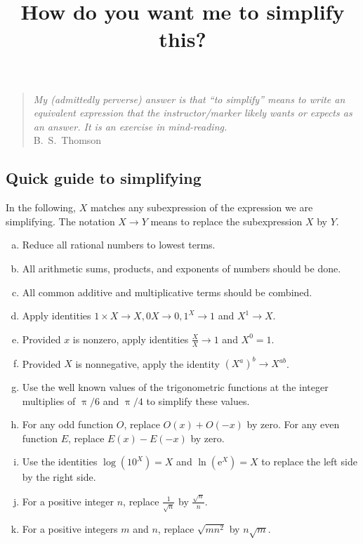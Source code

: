 \documentclass[12pt,fleqn]{article}
\title{How do you want me to simplify this?}
\newenvironment{alphalist}{
  \begin{enumerate}[(a)]
    \addtolength{\itemsep}{-0.5\itemsep}}
  {\end{enumerate}}
\begin{document}
\maketitle
\begin{quote}
\emph{My (admittedly perverse) answer is that ``to simplify''  means to write an 
equivalent expression that the instructor/marker likely wants or expects as an answer. It is an exercise in mind-reading.} \\  \phantom{xxxxx} \hfill   {\mbox{\sc B.\ S.\ Thomson}}
\end{quote}


\subsection*{Quick guide to simplifying}

In the following, $X$ matches any subexpression of the expression
we are simplifying. The notation $X \to Y$  means to replace
the subexpression $X$ by $Y$.

\begin{tcolorbox}
   \begin{alphalist}
   
   \item  Reduce all rational numbers to lowest terms.
   
   \item All arithmetic sums, products, and exponents of numbers should be done.
   
   \item All common additive and multiplicative terms should be combined.
   
   \item Apply identities  $1 \times X  \to  X,  0  X \to  0, 1^X \to  1$ and  $X^1  \to X$.
   
   \item Provided $x$ is  nonzero,  apply identities $\frac{X}{X} \to  1$ and $X^0 = 1$.
   
   \item Provided $X$ is  nonnegative, apply the identity $\left(X^a\right)^b \to  X^{a b}$.
   
   \item Use the well known values of the trigonometric functions at the integer multiplies of $\uppi/6$ and $\uppi/4$ to simplify these values.
   
   \item For any odd function $O$, replace $O(x) + O(-x)$ by zero. For any even function $E$, replace $E(x) - E(-x)$ by zero.
   
   \item Use the identities $\log(10^X) = X$ and $\ln(\mathrm{e}^X) = X$ 
   to replace the left side by the right side.
   
   \item For a positive integer $n$, replace $\frac{1}{\sqrt{n}}$ by $\frac{\sqrt{n}}{n}$.
   
   \item For a positive integers $m$ and $n$, replace $\sqrt{m n^2}$ by $n \sqrt{m}$. 
   
   \end{alphalist}
   \end{tcolorbox}
\end{document}
